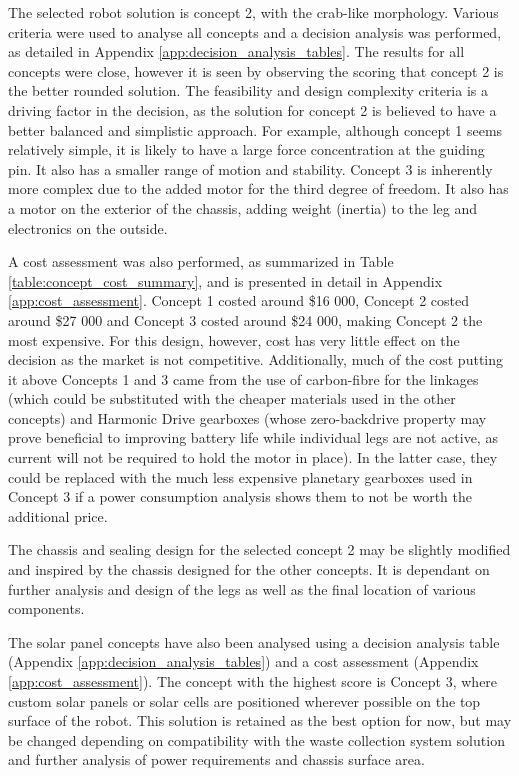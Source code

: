 The selected robot solution is concept 2, with the crab-like morphology. Various criteria were used to analyse all concepts and a decision analysis was performed, as detailed in Appendix \ref{app:decision_analysis_tables}. The results for all concepts were close, however it is seen by observing the scoring that concept 2 is the better rounded solution. The feasibility and design complexity criteria is a driving factor in the decision, as the solution for concept 2 is believed to have a better balanced and simplistic approach. For example, although concept 1 seems relatively simple, it is likely to have a large force concentration at the guiding pin. It also has a smaller range of motion and stability. Concept 3 is inherently more complex due to the added motor for the third degree of freedom. It also has a motor on the exterior of the chassis, adding weight (inertia) to the leg and electronics on the outside.

A cost assessment was also performed, as summarized in Table \ref{table:concept_cost_summary}, and is presented in detail in Appendix \ref{app:cost_assessment}. Concept 1 costed around \$16 000, Concept 2 costed around \$27 000 and Concept 3 costed around \$24 000, making Concept 2 the most expensive. For this design, however, cost has very little effect on the decision as the market is not competitive.
Additionally, much of the cost putting it above Concepts 1 and 3 came from the use of carbon-fibre for the linkages (which could be substituted with the cheaper materials used in the other concepts) and Harmonic Drive gearboxes (whose zero-backdrive property may prove beneficial to improving battery life while individual legs are not active, as current will not be required to hold the motor in place). In the latter case, they could be replaced with the much less expensive planetary gearboxes used in Concept 3 if a power consumption analysis shows them to not be worth the additional price.

The chassis and sealing design for the selected concept 2 may be slightly modified and inspired by the chassis designed for the other concepts. It is dependant on further analysis and design of the legs as well as the final location of various components.

The solar panel concepts have also been analysed using a decision analysis table (Appendix \ref{app:decision_analysis_tables}) and a cost assessment (Appendix \ref{app:cost_assessment}). The concept with the highest score is Concept 3, where custom solar panels or solar cells are positioned wherever possible on the top surface of the robot. This solution is retained as the best option for now, but may be changed depending on compatibility with the waste collection system solution and further analysis of power requirements and chassis surface area.

